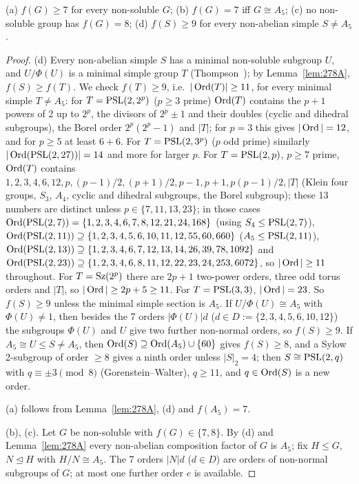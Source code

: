 \begin{theorem}\label{thm:278small}
(a) $f(G)\ge 7$ for every non-soluble $G$; (b) $f(G)=7$ iff $G\cong A_5$; (c) no non-soluble group has $f(G)=8$;
(d) $f(S)\ge 9$ for every non-abelian simple $S\ne A_5$.
\end{theorem}
\begin{proof}
(d) Every non-abelian simple $S$ has a minimal non-soluble subgroup $U$, and $U/\Phi(U)$ is a minimal simple group $T$
(Thompson~\cite{Thompson}); by Lemma~\ref{lem:278A}, $f(S)\ge f(T)$. We check $f(T)\ge 9$, i.e.\ $|\operatorname{Ord}(T)|\ge 11$,
for every minimal simple $T\ne A_5$: for $T=\mathrm{PSL}(2,2^p)$ ($p\ge 3$ prime) $\operatorname{Ord}(T)$ contains the $p+1$ powers of 2 up to
$2^p$, the divisors of $2^p\pm1$ and their doubles (cyclic and dihedral subgroups), the Borel order $2^p(2^p-1)$ and
$|T|$; for $p=3$ this gives $|\operatorname{Ord}|=12$, and for $p\ge 5$ at least $6+6$. For $T=\mathrm{PSL}(2,3^p)$ ($p$ odd prime) similarly
$|\operatorname{Ord}(\mathrm{PSL}(2,27))|=14$ and more for larger $p$. For $T=\mathrm{PSL}(2,p)$, $p\ge 7$ prime, $\operatorname{Ord}(T)$ contains
$1,2,3,4,6,12,p,(p-1)/2,(p+1)/2,p-1,p+1,p(p-1)/2,|T|$ (Klein four groups, $S_3$, $A_4$, cyclic and dihedral
subgroups, the Borel subgroup); these 13 numbers are distinct unless $p\in\{7,11,13,23\}$; in those cases
$\operatorname{Ord}(\mathrm{PSL}(2,7))=\{1,2,3,4,6,7,8,12,21,24,168\}$ (using $S_4\le\mathrm{PSL}(2,7)$),
$\operatorname{Ord}(\mathrm{PSL}(2,11))\supseteq\{1,2,3,4,5,6,10,11,12,55,60,660\}$ ($A_5\le\mathrm{PSL}(2,11)$),
$\operatorname{Ord}(\mathrm{PSL}(2,13))\supseteq\{1,2,3,4,6,7,12,13,14,26,39,78,1092\}$ and
$\operatorname{Ord}(\mathrm{PSL}(2,23))\supseteq\{1,2,3,4,6,8,11,12,22,23,24,253,6072\}$, so $|\operatorname{Ord}|\ge 11$ throughout. For $T=\mathrm{Sz}(2^p)$ there are $2p+1$
two-power orders, three odd torus orders and $|T|$, so $|\operatorname{Ord}|\ge 2p+5\ge 11$. For $T=\mathrm{PSL}(3,3)$, $|\operatorname{Ord}|=23$.
So $f(S)\ge 9$ unless the minimal simple section is $A_5$. If $U/\Phi(U)\cong A_5$ with $\Phi(U)\ne 1$, then
besides the 7 orders $|\Phi(U)|d$ ($d\in D:=\{2,3,4,5,6,10,12\}$) the subgroups $\Phi(U)$ and $U$ give two further
non-normal orders, so $f(S)\ge 9$. If $A_5\cong U\le S\ne A_5$, then $\operatorname{Ord}(S)\supseteq\operatorname{Ord}(A_5)\cup\{60\}$ gives
$f(S)\ge 8$, and a Sylow 2-subgroup of order $\ge 8$ gives a ninth order unless $|S|_2=4$; then $S\cong\mathrm{PSL}(2,q)$ with
$q\equiv\pm3\pmod 8$ (Gorenstein--Walter), $q\ge 11$, and $q\in\operatorname{Ord}(S)$ is a new order.

(a) follows from Lemma~\ref{lem:278A}, (d) and $f(A_5)=7$.

(b), (c). Let $G$ be non-soluble with $f(G)\in\{7,8\}$. By (d) and Lemma~\ref{lem:278A} every non-abelian
composition factor of $G$ is $A_5$; fix $H\le G$, $N\trianglelefteq H$ with $H/N\cong A_5$. The 7 orders $|N|d$
($d\in D$) are orders of non-normal subgroups of $G$; at most one further order $e$ is available.


\end{proof}

